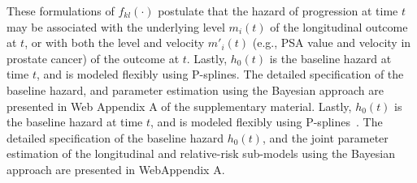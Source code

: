 These formulations of $f_{kl}(\cdot)$ postulate that the hazard of progression at time $t$ may be associated with the underlying level $m_i(t)$ of the longitudinal outcome at $t$, or with both the level and velocity $m'_i(t)$ (e.g., PSA value and velocity in prostate cancer) of the outcome at $t$. Lastly, $h_0(t)$ is the baseline hazard at time $t$, and is modeled flexibly using P-splines. The detailed specification of the baseline hazard, and parameter estimation using the Bayesian approach are presented in Web Appendix A of the supplementary material. Lastly, $h_0(t)$ is the baseline hazard at time $t$, and is modeled flexibly using P-splines~\citep{eilers1996flexible}. The detailed specification of the baseline hazard $h_0(t)$, and the joint parameter estimation of the longitudinal and relative-risk sub-models using the Bayesian approach are presented in WebAppendix A.
